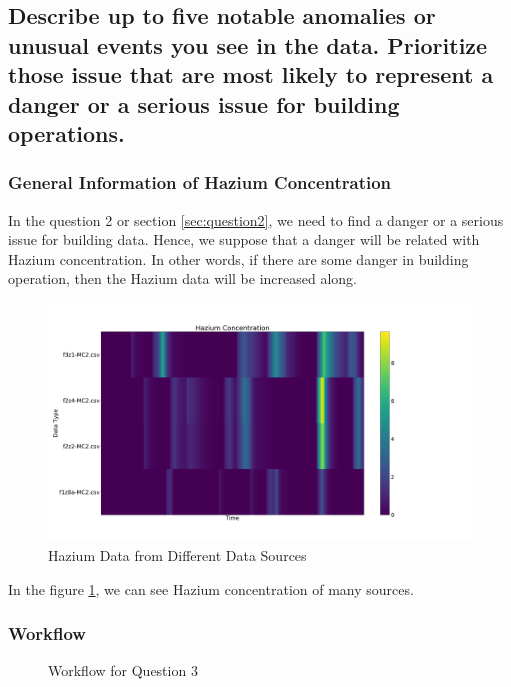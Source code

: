 \documentclass[aps, 10pt, a4paper]{article}
\begin{document}
        \subsection[Question 3]{Describe up to five notable anomalies or unusual events you see in the data. Prioritize those issue that are most likely to represent a danger or a serious issue for building operations.}
            \label{sec:question3}
            \subsubsection{General Information of Hazium Concentration}
                In the question 2 or section \ref{sec:question2}, we need to find a danger or a serious issue for building data. Hence, we suppose that a danger will be related with Hazium concentration. In other words, if there are some danger in building operation, then the Hazium data will be increased along. 
                
                \begin{figure}[htbp]
                    \centering
                    \includegraphics[width=0.4 \linewidth]{figures/hazium.png}
                    \caption{Hazium Data from Different Data Sources}
                    \label{fig:generalhazium}
                \end{figure}
            
                In the figure \ref{fig:generalhazium}, we can see Hazium concentration of many sources. 

            \subsubsection{Workflow}
                \begin{figure}[htbp]
                    \centering
                    \begin{tikzpicture}[node distance = 2cm, auto]
                    \end{tikzpicture}
                    \caption{Workflow for Question 3}
                    \label{fig:workflow3}
                \end{figure}
            
\end{document}
